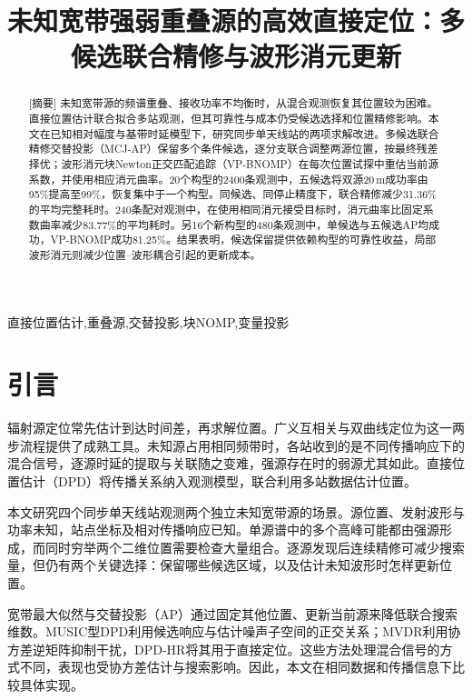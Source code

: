 \documentclass[a4paper,fleqn]{cas-sc}
\begin{document}
\let\WriteBookmarks\relax
{}
\shortauthors{}
\title[mode=title]{未知宽带强弱重叠源的高效直接定位：多候选联合精修与波形消元更新}
\begin{abstract}[摘要]
未知宽带源的频谱重叠、接收功率不均衡时，从混合观测恢复其位置较为困难。直接位置估计联合拟合多站观测，但其可靠性与成本仍受候选选择和位置精修影响。本文在已知相对幅度与基带时延模型下，研究同步单天线站的两项求解改进。多候选联合精修交替投影（MCJ-AP）保留多个条件候选，逐分支联合调整两源位置，按最终残差择优；波形消元块Newton正交匹配追踪（VP-BNOMP）在每次位置试探中重估当前源系数，并使用相应消元曲率。20个构型的2400条观测中，五候选将双源20\,m成功率由95\%提高至99\%，恢复集中于一个构型。同候选、同停止精度下，联合精修减少31.36\%的平均完整耗时。240条配对观测中，在使用相同消元接受目标时，消元曲率比固定系数曲率减少83.77\%的平均耗时。另16个新构型的480条观测中，单候选与五候选AP均成功，VP-BNOMP成功81.25\%。结果表明，候选保留提供依赖构型的可靠性收益，局部波形消元则减少位置--波形耦合引起的更新成本。
\end{abstract}
\begin{keywords}[关键词]
直接位置估计\sep 重叠源\sep 交替投影\sep 块NOMP\sep 变量投影
\end{keywords}
\maketitle

\FloatBarrier
\section{引言}
辐射源定位常先估计到达时间差，再求解位置。广义互相关与双曲线定位为这一两步流程提供了成熟工具\cite{KnappCarter1976,ChanHo1994}。未知源占用相同频带时，各站收到的是不同传播响应下的混合信号，逐源时延的提取与关联随之变难，强源存在时的弱源尤其如此。直接位置估计（DPD）将传播关系纳入观测模型，联合利用多站数据估计位置\cite{ChenHudsonYao2002,WeissAmar2005}。

本文研究四个同步单天线站观测两个独立未知宽带源的场景。源位置、发射波形与功率未知，站点坐标及相对传播响应已知。单源谱中的多个高峰可能都由强源形成，而同时穷举两个二维位置需要检查大量组合。逐源发现后连续精修可减少搜索量，但仍有两个关键选择：保留哪些候选区域，以及估计未知波形时怎样更新位置。

宽带最大似然与交替投影（AP）通过固定其他位置、更新当前源来降低联合搜索维数\cite{ChenHudsonYao2002}。MUSIC型DPD利用候选响应与估计噪声子空间的正交关系\cite{WeissAmar2005}；MVDR利用协方差逆矩阵抑制干扰\cite{Capon1969}，DPD-HR将其用于直接定位\cite{TirerWeiss2016}。这些方法处理混合信号的方式不同，表现也受协方差估计与搜索影响。因此，本文在相同数据和传播信息下比较具体实现。
\end{document}
